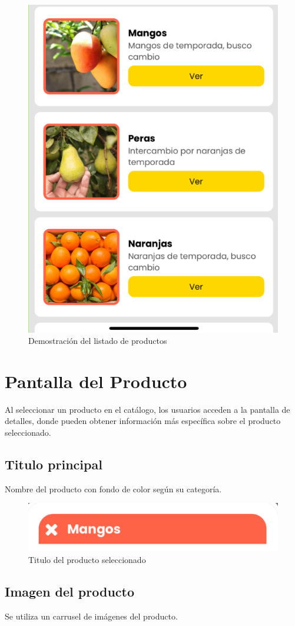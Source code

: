 \documentclass[11pt, a4paper, oneside]{book}
\begin{document}
\begin{itemize}
\begin{figure}[H]
    \centering
    \includegraphics[width=0.5
    \linewidth]{Pictures/ListaProductos.png  }
            \caption{Demostración del listado de productos}
\end{figure}

\end{itemize}


\section{Pantalla del Producto}
Al seleccionar un producto en el catálogo, los usuarios acceden a la pantalla de detalles, donde pueden obtener información más específica sobre el producto seleccionado.
\subsection{Titulo principal}
Nombre del producto con fondo de color según su categoría.

\begin{figure}[H]
    \centering
    \includegraphics[width=0.5
    \linewidth]{Pictures/TituloProducto.png  }
            \caption{Titulo del producto seleccionado}
\end{figure}

\subsection{Imagen del producto}
Se utiliza un carrusel de imágenes del producto.
\end{document}
